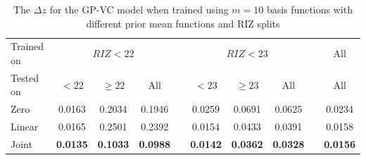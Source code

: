 \documentclass[useAMS,usenatbib,fleqn]{mn2e}
\begin{document}
 \begin{table}
\caption{The $\Delta z$ for the GP-VC model when trained using $m=10$ basis functions with different prior mean functions and RIZ splits}
\begin{center}
  \begin{tabular}{| l | c | c | c | c | c | c | c | c | c |}
  	Trained on				& 	\multicolumn{3}{|c|}{ $RIZ<22$}				&	& 	\multicolumn{3}{c}{$RIZ<23$}  &  & All\\ \cline{2-4} \cline{6-8} \cline{10-10} 
     	Tested on					&	$<22$			&	$\ge 22$		&	All				&	&	$<23$	&	$\ge 23$	&	All	& & All\\	\hline
	Zero						&	0.0163			&	0.2034			&	0.1946			&	&	0.0259	&	0.0691	&	0.0625 &  & 0.0234				\\
	Linear						&	0.0165			&	0.2501			&	0.2392			&	&	0.0154	&	0.0433	&	0.0391 &  & 0.0158				\\
	Joint						&	\textbf{0.0135}	&	\textbf{0.1033}	&	\textbf{0.0988}	&	&	\textbf{0.0142}	&	\textbf{0.0362}	&	\textbf{0.0328} &  & \textbf{0.0156}	\\	\hline
  \end{tabular}
\end{center}
\label{table-RIZ-splits}
\end{table}
\end{document}
